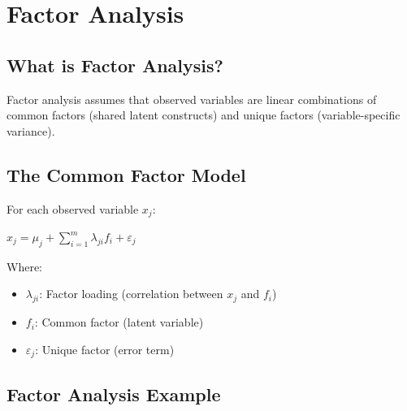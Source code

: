 \documentclass[
]{article}
\begin{document}
\section{Factor Analysis}

\subsection{What is Factor Analysis?}

Factor analysis assumes that observed variables are linear combinations
of common factors (shared latent constructs) and unique factors
(variable-specific variance).

\subsection{The Common Factor Model}

For each observed variable \(x_{j}\):

\(x_{j} = \mu_{j} + \sum_{i = 1}^{m}\lambda_{ji}f_{i} + \varepsilon_{j}\)

Where:

\begin{itemize}
\item
  \(\lambda_{ji}\): Factor loading (correlation between \(x_{j}\) and
  \(f_{i}\))
\item
  \(f_{i}\): Common factor (latent variable)
\item
  \(\varepsilon_{j}\): Unique factor (error term)
\end{itemize}

\subsection{Factor Analysis Example}
\end{document}
